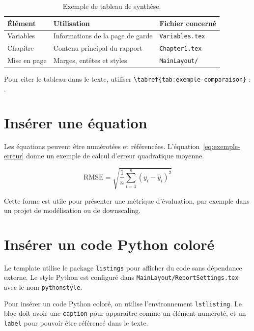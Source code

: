 \begin{table}[H]
  \centering
  \caption{Exemple de tableau de synthèse.}
  \label{tab:exemple-comparaison}
  \begin{tabular}{>{\raggedright\arraybackslash}p{}>{\raggedright\arraybackslash}p{}>{\raggedright\arraybackslash}p{}}
    \toprule
    Élément & Utilisation & Fichier concerné \\
    \midrule
    Variables & Informations de la page de garde & \texttt{Variables.tex} \\
    Chapitre & Contenu principal du rapport & \texttt{Chapter1.tex} \\
    Mise en page & Marges, entêtes et styles & \texttt{MainLayout/} \\
    \bottomrule
  \end{tabular}
\end{table}

Pour citer le tableau dans le texte, utiliser \verb|\tabref{tab:exemple-comparaison}| : .

\section{Insérer une équation}

Les équations peuvent être numérotées et référencées. L'équation~\ref{eq:exemple-erreur} donne un exemple de calcul d'erreur quadratique moyenne.

\begin{equation}
  \mathrm{RMSE}=\sqrt{\frac{1}{n}\sum_{i=1}^{n}(y_i-\hat{y}_i)^2}
  \label{eq:exemple-erreur}
\end{equation}

Cette forme est utile pour présenter une métrique d'évaluation, par exemple dans un projet de modélisation ou de downscaling.


\section{Insérer un code Python coloré}

Le template utilise le package \texttt{listings} pour afficher du code sans dépendance externe. Le style Python est configuré dans \texttt{MainLayout/ReportSettings.tex} avec le nom \texttt{pythonstyle}.

Pour insérer un code Python coloré, on utilise l'environnement \texttt{lstlisting}. Le bloc doit avoir une \texttt{caption} pour apparaître comme un élément numéroté, et un \texttt{label} pour pouvoir être référencé dans le texte.


